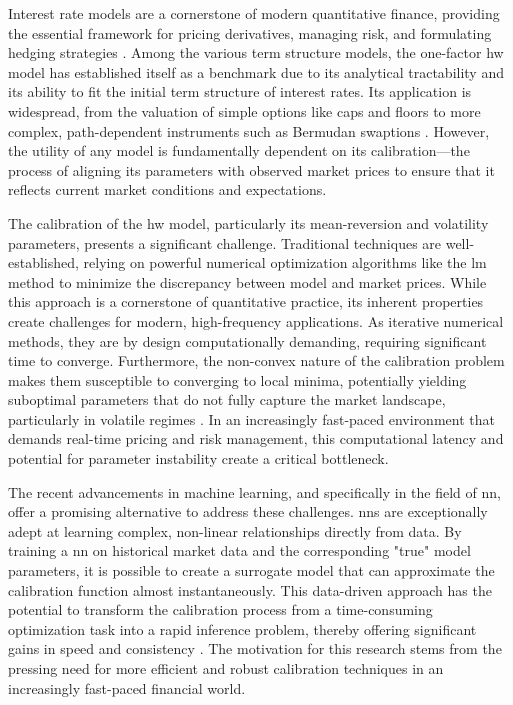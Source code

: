 Interest rate models are a cornerstone of modern quantitative finance, providing the essential framework for pricing derivatives, managing risk, and formulating hedging strategies \parencite{moysiadis2019calibrating}. Among the various term structure models, the one-factor \ac{hw} model has established itself as a benchmark due to its analytical tractability and its ability to fit the initial term structure of interest rates. Its application is widespread, from the valuation of simple options like caps and floors to more complex, path-dependent instruments such as Bermudan swaptions \parencite[p.~72]{brigo2006interest}. However, the utility of any model is fundamentally dependent on its calibration—the process of aligning its parameters with observed market prices to ensure that it reflects current market conditions and expectations.

The calibration of the \ac{hw} model, particularly its mean-reversion and volatility parameters, presents a significant challenge. Traditional techniques are well-established, relying on powerful numerical optimization algorithms like the \ac{lm} method to minimize the discrepancy between model and market prices. While this approach is a cornerstone of quantitative practice, its inherent properties create challenges for modern, high-frequency applications. As iterative numerical methods, they are by design computationally demanding, requiring significant time to converge. Furthermore, the non-convex nature of the calibration problem makes them susceptible to converging to local minima, potentially yielding suboptimal parameters that do not fully capture the market landscape, particularly in volatile regimes \parencite{vollrath2009calibration}. In an increasingly fast-paced environment that demands real-time pricing and risk management, this computational latency and potential for parameter instability create a critical bottleneck.

The recent advancements in machine learning, and specifically in the field of \ac{nn}, offer a promising alternative to address these challenges. \ac{nn}s are exceptionally adept at learning complex, non-linear relationships directly from data. By training a \ac{nn} on historical market data and the corresponding "true" model parameters, it is possible to create a surrogate model that can approximate the calibration function almost instantaneously. This data-driven approach has the potential to transform the calibration process from a time-consuming optimization task into a rapid inference problem, thereby offering significant gains in speed and consistency \parencite{hernandez2016model}. The motivation for this research stems from the pressing need for more efficient and robust calibration techniques in an increasingly fast-paced financial world.


